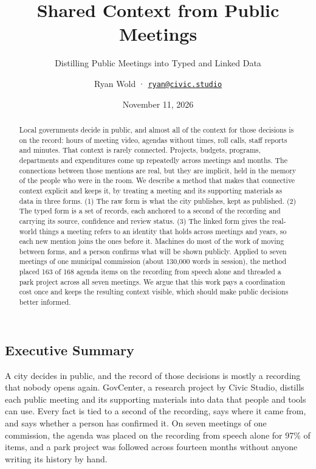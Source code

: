 \documentclass[
  american,
  letterpaper,
  11pt]{article}
\title{Shared Context from Public Meetings}
\subtitle{Distilling Public Meetings into Typed and Linked Data}
\author{Ryan Wold · \href{mailto:ryan@civic.studio}{\nolinkurl{ryan@civic.studio}}}
\date{November 11, 2026}
\begin{document}
\maketitle
\begin{abstract}
Local governments decide in public, and almost all of the context for those decisions is on the record: hours of meeting video, agendas without times, roll calls, staff reports and minutes.
That context is rarely connected.
Projects, budgets, programs, departments and expenditures come up repeatedly across meetings and months.
The connections between those mentions are real, but they are implicit, held in the memory of the people who were in the room.
We describe a method that makes that connective context explicit and keeps it, by treating a meeting and its supporting materials as data in three forms.
(1) The raw form is what the city publishes, kept as published.
(2) The typed form is a set of records, each anchored to a second of the recording and carrying its source, confidence and review status.
(3) The linked form gives the real-world things a meeting refers to an identity that holds across meetings and years, so each new mention joins the ones before it.
Machines do most of the work of moving between forms, and a person confirms what will be shown publicly.
Applied to seven meetings of one municipal commission (about 130,000 words in session), the method placed 163 of 168 agenda items on the recording from speech alone and threaded a park project across all seven meetings.
We argue that this work pays a coordination cost once and keeps the resulting context visible, which should make public decisions better informed.
\end{abstract}

\subsection*{Executive Summary}\label{executive-summary}

A city decides in public, and the record of those decisions is mostly a recording that nobody opens again.
GovCenter, a research project by Civic Studio, distills each public meeting and its supporting materials into data that people and tools can use.
Every fact is tied to a second of the recording, says where it came from, and says whether a person has confirmed it.
On seven meetings of one commission, the agenda was placed on the recording from speech alone for 97\% of items, and a park project was followed across fourteen months without anyone writing its history by hand.
\end{document}
